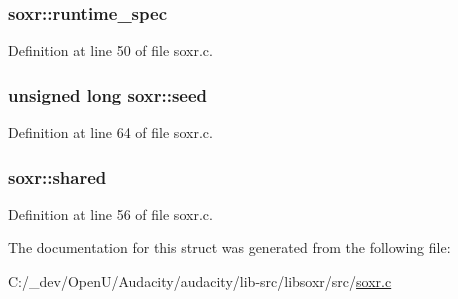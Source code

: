 \subsubsection[{\texorpdfstring{runtime\+\_\+spec}{runtime_spec}}]{ soxr\+::runtime\+\_\+spec}\hypertarget{structsoxr_a2ba74dd0f08cbb5fa88fdef8abcf0ad6}{}\label{structsoxr_a2ba74dd0f08cbb5fa88fdef8abcf0ad6}


Definition at line 50 of file soxr.\+c.

\subsubsection[{\texorpdfstring{seed}{seed}}]{\setlength{\rightskip}{0pt plus 5cm}unsigned long soxr\+::seed}\hypertarget{structsoxr_ab8b3d69d3f6c62f18cb464594b19d078}{}\label{structsoxr_ab8b3d69d3f6c62f18cb464594b19d078}


Definition at line 64 of file soxr.\+c.

\subsubsection[{\texorpdfstring{shared}{shared}}]{ soxr\+::shared}\hypertarget{structsoxr_a7a11d730c8daa76d2367fd94b2384bf9}{}\label{structsoxr_a7a11d730c8daa76d2367fd94b2384bf9}


Definition at line 56 of file soxr.\+c.



The documentation for this struct was generated from the following file\+:\begin{DoxyCompactItemize}
\item 
C\+:/\+\_\+dev/\+Open\+U/\+Audacity/audacity/lib-\/src/libsoxr/src/\hyperlink{soxr_8c}{soxr.\+c}\end{DoxyCompactItemize}
